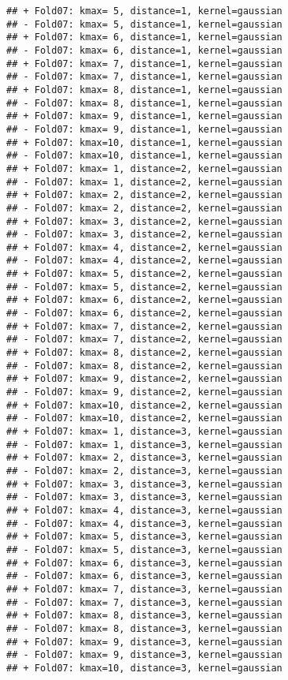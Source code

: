 \documentclass[
]{article}
\begin{document}
\begin{verbatim}
## + Fold07: kmax= 5, distance=1, kernel=gaussian 
## - Fold07: kmax= 5, distance=1, kernel=gaussian 
## + Fold07: kmax= 6, distance=1, kernel=gaussian 
## - Fold07: kmax= 6, distance=1, kernel=gaussian 
## + Fold07: kmax= 7, distance=1, kernel=gaussian 
## - Fold07: kmax= 7, distance=1, kernel=gaussian 
## + Fold07: kmax= 8, distance=1, kernel=gaussian 
## - Fold07: kmax= 8, distance=1, kernel=gaussian 
## + Fold07: kmax= 9, distance=1, kernel=gaussian 
## - Fold07: kmax= 9, distance=1, kernel=gaussian 
## + Fold07: kmax=10, distance=1, kernel=gaussian 
## - Fold07: kmax=10, distance=1, kernel=gaussian 
## + Fold07: kmax= 1, distance=2, kernel=gaussian 
## - Fold07: kmax= 1, distance=2, kernel=gaussian 
## + Fold07: kmax= 2, distance=2, kernel=gaussian 
## - Fold07: kmax= 2, distance=2, kernel=gaussian 
## + Fold07: kmax= 3, distance=2, kernel=gaussian 
## - Fold07: kmax= 3, distance=2, kernel=gaussian 
## + Fold07: kmax= 4, distance=2, kernel=gaussian 
## - Fold07: kmax= 4, distance=2, kernel=gaussian 
## + Fold07: kmax= 5, distance=2, kernel=gaussian 
## - Fold07: kmax= 5, distance=2, kernel=gaussian 
## + Fold07: kmax= 6, distance=2, kernel=gaussian 
## - Fold07: kmax= 6, distance=2, kernel=gaussian 
## + Fold07: kmax= 7, distance=2, kernel=gaussian 
## - Fold07: kmax= 7, distance=2, kernel=gaussian 
## + Fold07: kmax= 8, distance=2, kernel=gaussian 
## - Fold07: kmax= 8, distance=2, kernel=gaussian 
## + Fold07: kmax= 9, distance=2, kernel=gaussian 
## - Fold07: kmax= 9, distance=2, kernel=gaussian 
## + Fold07: kmax=10, distance=2, kernel=gaussian 
## - Fold07: kmax=10, distance=2, kernel=gaussian 
## + Fold07: kmax= 1, distance=3, kernel=gaussian 
## - Fold07: kmax= 1, distance=3, kernel=gaussian 
## + Fold07: kmax= 2, distance=3, kernel=gaussian 
## - Fold07: kmax= 2, distance=3, kernel=gaussian 
## + Fold07: kmax= 3, distance=3, kernel=gaussian 
## - Fold07: kmax= 3, distance=3, kernel=gaussian 
## + Fold07: kmax= 4, distance=3, kernel=gaussian 
## - Fold07: kmax= 4, distance=3, kernel=gaussian 
## + Fold07: kmax= 5, distance=3, kernel=gaussian 
## - Fold07: kmax= 5, distance=3, kernel=gaussian 
## + Fold07: kmax= 6, distance=3, kernel=gaussian 
## - Fold07: kmax= 6, distance=3, kernel=gaussian 
## + Fold07: kmax= 7, distance=3, kernel=gaussian 
## - Fold07: kmax= 7, distance=3, kernel=gaussian 
## + Fold07: kmax= 8, distance=3, kernel=gaussian 
## - Fold07: kmax= 8, distance=3, kernel=gaussian 
## + Fold07: kmax= 9, distance=3, kernel=gaussian 
## - Fold07: kmax= 9, distance=3, kernel=gaussian 
## + Fold07: kmax=10, distance=3, kernel=gaussian 

\end{verbatim}
\end{document}
